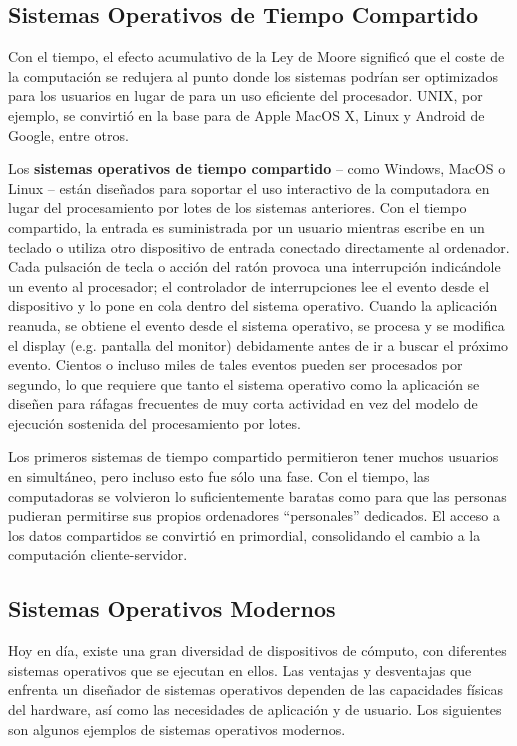 \documentclass[10pt]{book}
\begin{document}
\subsection{Sistemas Operativos de Tiempo Compartido}
Con el tiempo, el efecto acumulativo de la Ley de Moore significó que el coste de la computación se redujera al punto donde los sistemas podrían ser optimizados para los usuarios en lugar de para un uso eficiente del procesador. UNIX, por ejemplo, se convirtió en la base para de Apple MacOS X, Linux y Android de Google, entre otros.

Los \textbf{sistemas operativos de tiempo compartido} -- como Windows, MacOS o Linux -- están diseñados para soportar el uso interactivo de la computadora en lugar del procesamiento por lotes de los sistemas anteriores. Con el tiempo compartido, la entrada es suministrada por un usuario mientras escribe en un teclado o utiliza otro dispositivo de entrada conectado directamente al ordenador. Cada pulsación de tecla o acción del ratón provoca una interrupción indicándole un evento al procesador; el controlador de interrupciones lee el evento desde el dispositivo y lo pone en cola dentro del sistema operativo. Cuando la aplicación reanuda, se obtiene el evento desde el sistema operativo, se procesa y se modifica el display (e.g. pantalla del monitor) debidamente antes de ir a buscar el próximo evento. Cientos o incluso miles de tales eventos pueden ser procesados por segundo, lo que requiere que tanto el sistema operativo como la aplicación se diseñen para ráfagas frecuentes de muy corta actividad en vez del modelo de ejecución sostenida del procesamiento por lotes.

Los primeros sistemas de tiempo compartido permitieron tener muchos usuarios en simultáneo, pero incluso esto fue sólo una fase. Con el tiempo, las computadoras se volvieron lo suficientemente baratas como para que las personas pudieran permitirse sus propios ordenadores ``personales'' dedicados. El acceso a los datos compartidos se convirtió en primordial, consolidando el cambio a la computación cliente-servidor.


\subsection{Sistemas Operativos Modernos}
Hoy en día, existe una gran diversidad de dispositivos de cómputo, con diferentes sistemas operativos que se ejecutan en ellos. Las ventajas y desventajas que enfrenta un diseñador de sistemas operativos dependen de las capacidades físicas del hardware, así como las necesidades de aplicación y de usuario. Los siguientes son algunos ejemplos de sistemas operativos modernos.
\end{document}

